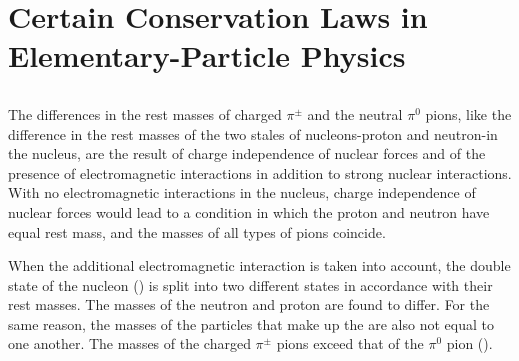 \section[Conservation Laws of Elementary Particles]{Certain Conservation Laws in Elementary-Particle Physics}
\label{sec-43.4} 

\subsection{}\label{43.4.1} The differences in the rest masses of charged $\pi^{\pm}$ and the neutral $\pi^{0}$ pions, like the difference in the rest masses of the
two stales of nucleons-proton and neutron-in the nucleus,
are the result of charge independence of nuclear forces  and of the presence of electromagnetic interactions in addition to strong nuclear interactions. With no electromagnetic interactions in the nucleus, charge independence of nuclear forces would lead to a condition in which the proton and neutron have equal rest mass, and the masses of all types of pions coincide.

When the additional electromagnetic interaction is taken into account, the double state of the nucleon () is split into two different states in accordance with their rest masses. The masses of the neutron and proton are found to differ. For the same reason, the masses of the particles that make up the  are also not equal to one another. The masses of the charged $\pi^{\pm}$ pions exceed that of the $\pi^{0}$ pion ().

